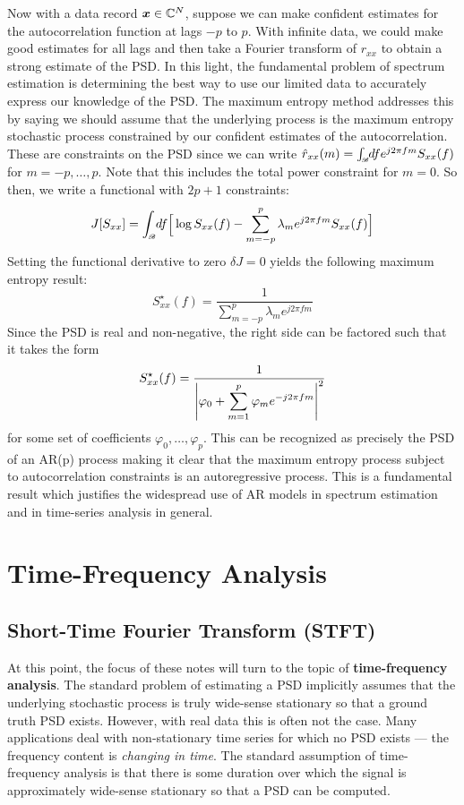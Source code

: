 \documentclass[twocolumn]{gwclass}
\newcommand{\C}{\mathbb{C}}
\newcommand{\intbw}[1]{\int_{\hspace{-0.1em}\scriptscriptstyle\mathscr{B}}\hspace{-0.25em}}
\begin{document}
Now with a data record $\*x\in \C^N$, suppose we can make confident estimates for the autocorrelation function at lags $-p$ to $p$. With infinite data, we could make good estimates for all lags and then take a Fourier transform of $r_{xx}$ to obtain a strong estimate of the PSD. In this light, the fundamental problem of spectrum estimation is determining the best way to use our limited data to accurately express our knowledge of the PSD. The maximum entropy method addresses this by saying we should assume that the underlying process is the maximum entropy stochastic process constrained by our confident estimates of the autocorrelation. These are constraints on the PSD since we can write $ \hat{r}_{xx}(m) = \intbw{1} df e^{j2\pi fm} S_{xx}(f) $ for $m=-p,\dots,p$. Note that this includes the total power constraint for $m=0$. So then, we write a functional with $2p+1$ constraints:
$$ \footnotesize J[S_{xx}] = \intbw{1} df\bigg[\log S_{xx}(f) -  \sum_{m=-p}^p \lambda_m e^{j2\pi f m}S_{xx}(f) \bigg]  $$
Setting the functional derivative to zero $\delta J=0$ yields the following maximum entropy result:
$$ S^\star_{xx}(f) = \frac{1}{\displaystyle\sum_{m=-p}^p \lambda_m e^{j2\pi f m}} $$
Since the PSD is real and non-negative, the right side can be factored such that it takes the form
$$ S^\star_{xx}(f) = \frac{1}{\abs{\varphi_0 + \displaystyle\sum_{m=1}^p \varphi_m e^{-j2\pi f m}}^2} $$
for some set of coefficients $\varphi_0,\dots,\varphi_p$. This can be recognized as precisely the PSD of an AR(p) process making it clear that the maximum entropy process subject to autocorrelation constraints is an autoregressive process. This is a fundamental result which justifies the widespread use of AR models in spectrum estimation and in time-series analysis in general.

\section{Time-Frequency Analysis}
\subsection{Short-Time Fourier Transform (STFT)}
At this point, the focus of these notes will turn to the topic of \textbf{time-frequency analysis}. The standard problem of estimating a PSD implicitly assumes that the underlying stochastic process is truly wide-sense stationary so that a ground truth PSD exists. However, with real data this is often not the case. Many applications deal with non-stationary time series for which no PSD exists --- the frequency content is \emph{changing in time}. The standard assumption of time-frequency analysis is that there is some duration over which the signal is approximately wide-sense stationary so that a PSD can be computed.
\end{document}
